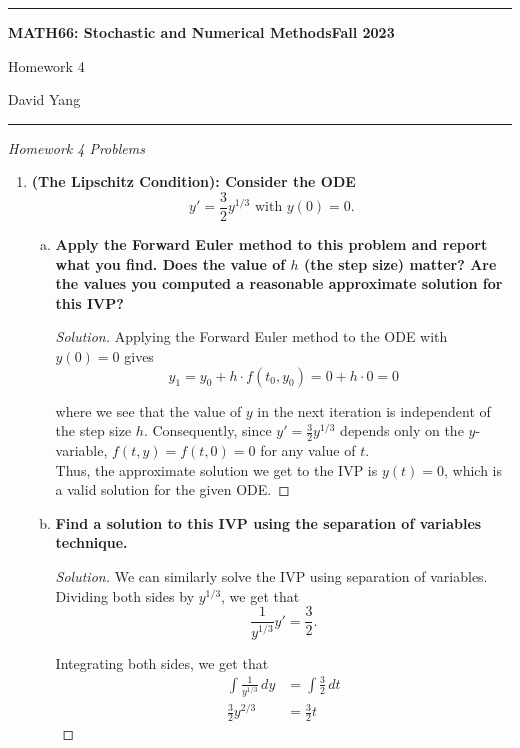 \documentclass[11pt]{article}
\newenvironment{solution}
  {\renewcommand\qedsymbol{$\blacksquare$}\begin{proof}[Solution]}
  {\end{proof}}
\theoremstyle{definition}
\begin{document}
	\hrule
	\begin{center}
        \textbf{MATH66: Stochastic and Numerical Methods}\hfill \textbf{Fall 2023}\newline

		{\Large Homework 4}

		David Yang
	\end{center}

\hrule

\vspace{1em}

\textit{Homework 4 Problems} \\

\begin{enumerate}
    \item \textbf{(The Lipschitz Condition): Consider the ODE \[ y' = \frac{3}{2}y^{1/3} \text{ with } y(0) = 0.\]}
    \begin{enumerate}[a)]
        \item \textbf{Apply the Forward Euler method to this problem and report what you find. Does the value of $h$ (the step size) matter? Are the values you computed a reasonable approximate solution for this IVP?}
       
        \begin{solution}
            Applying the Forward Euler method to the ODE with $y(0) = 0$ gives
            \[ y_{1} = y_0 + h \cdot f(t_0, y_0) = 0 + h \cdot 0 = 0 \]

            where we see that the value of $y$ in the next iteration is independent of the step size $h$. Consequently, since $y' = \frac{3}{2}y^{1/3}$ depends only on the $y$-variable,
            $f(t, y) = f(t, 0) = 0$ for any value of $t$. \\

            Thus, the approximate solution we get to the IVP is $\boxed{y(t) = 0}$, which is a valid solution for the given ODE. 
        \end{solution}

        \item \textbf{Find a solution to this IVP using the separation of variables technique.}
        
        \begin{solution}
        We can similarly solve the IVP using separation of variables. Dividing both sides by $y^{1/3}$, we get that
        \[ \frac{1}{y^{1/3}} y' = \frac{3}{2}. \]

        Integrating both sides, we get that
        \begin{align*}
            \int \frac{1}{y^{1/3}} \, dy &= \int \frac{3}{2} \, dt \\
            \frac{3}{2}y^{2/3} &= \frac{3}{2} t 
        \end{align*}


\end{solution}
\end{enumerate}
\end{enumerate}
\end{document}
